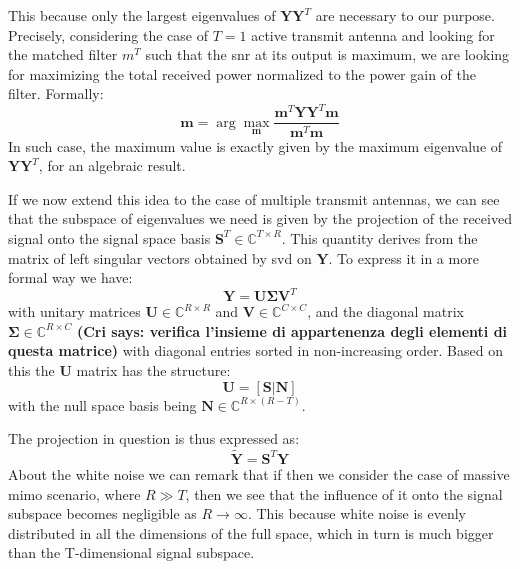 \documentclass[11pt]{book}
\newcommand{\argmax}{\arg\!\max} %
\newcommand{\cri}[1]{\textcolor{MyColor2}{\textbf{(Cri says: #1)}}}
\begin{document}
This because only the largest eigenvalues of $\mathbf{Y}\mathbf{Y}^T$ are necessary to our purpose. Precisely, considering the case of $T = 1$ active transmit antenna and looking for the matched filter $m^T$ such that the \gls{snr} at its output is maximum, we are looking for maximizing the total received power normalized to the power gain of the filter. Formally:
\begin{equation}
  \mathbf{m} = \argmax_{\mathbf{m}}\frac{\mathbf{m}^T\mathbf{Y}\mathbf{Y}^T\mathbf{m}}{\mathbf{m}^T\mathbf{m}}
\end{equation}
In such case, the maximum value is exactly given by the maximum eigenvalue of $\mathbf{Y}\mathbf{Y}^T$, for an algebraic result.

If we now extend this idea to the case of multiple transmit antennas, we can see that the subspace of eigenvalues we need is given by the projection of the received signal onto the signal space basis $\mathbf{S}^T \in \mathbb{C}^{T\times R}$. This quantity derives from the matrix of left singular vectors obtained by \gls{svd} on $\mathbf{Y}$. To express it in a more formal way we have:
\begin{equation}
  \mathbf{Y} = \mathbf{U} \mathbf{\Sigma} \mathbf{V}^T
\end{equation}
with unitary matrices $\mathbf{U} \in \mathbb{C}^{R\times R}$ and $\mathbf{V} \in \mathbb{C}^{C\times C}$, and the diagonal matrix $\mathbf{\Sigma} \in \mathbb{C}^{R\times C}$ \cri{verifica l'insieme di appartenenza degli elementi di questa matrice} with diagonal entries sorted in non-increasing order. Based on this the $\mathbf{U}$ matrix has the structure:
\begin{equation}
  \mathbf{U} = [\mathbf{S|\mathbf{N}}]
\end{equation}
with the null space basis being $\mathbf{N} \in \mathbb{C}^{R\times (R-T)}$.

The projection in question is thus expressed as:
\begin{equation}
  \mathbf{\tilde{Y}} = \mathbf{S}^T\mathbf{Y}
\end{equation}
About the white noise we can remark that if then we consider the case of massive \gls{mimo} scenario, where $R \gg T$, then we see that the influence of it onto the signal subspace becomes negligible as $R \rightarrow \infty$. This because white noise is evenly distributed in all the dimensions of the full space, which in turn is much bigger than the T-dimensional signal subspace.
\end{document}
